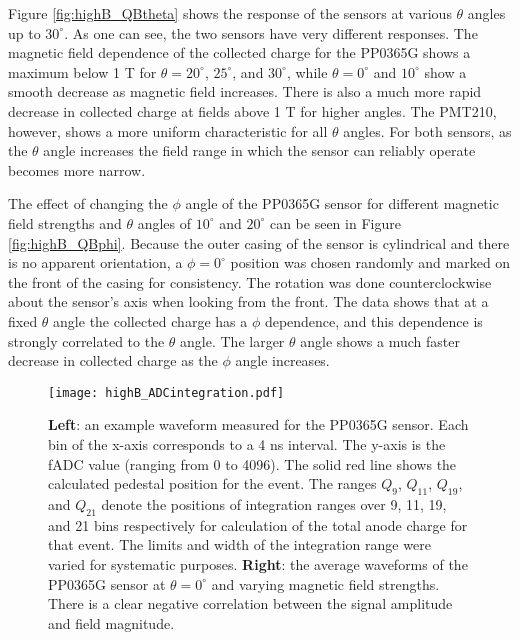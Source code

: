 Figure \ref{fig:highB_QBtheta} shows the response of the sensors at various $\theta$ angles up to $30^{\circ}$. As one can see, the two sensors have very different responses. The magnetic field dependence of the collected charge for the PP0365G shows a maximum below 1 T for $\theta = 20^{\circ}$, $25^{\circ}$, and $30^{\circ}$, while $\theta = 0^{\circ}$ and $10^{\circ}$ show a smooth decrease as magnetic field increases. There is also a much more rapid decrease in collected charge at fields above 1 T for higher angles. The PMT210, however, shows a more uniform characteristic for all $\theta$ angles. For both sensors, as the $\theta$ angle increases the field range in which the sensor can reliably operate becomes more narrow.

The effect of changing the $\phi$ angle of the PP0365G sensor for different magnetic field strengths and $\theta$ angles of $10^{\circ}$ and $20^{\circ}$ can be seen in Figure \ref{fig:highB_QBphi}. Because the outer casing of the sensor is cylindrical and there is no apparent orientation, a $\phi = 0^{\circ}$ position was chosen randomly and marked on the front of the casing for consistency. The rotation was done counterclockwise about the sensor's axis when looking from the front. The data shows that at a fixed $\theta$ angle the collected charge has a $\phi$ dependence, and this dependence is strongly correlated to the $\theta$ angle. The larger $\theta$ angle shows a much faster decrease in collected charge as the $\phi$ angle increases.

\begin{figure}[!htb]
	\centering
	\texttt{[image: highB\_ADCintegration.pdf]}
	\caption{\textbf{Left}: an example waveform measured for the PP0365G sensor. Each bin of the x-axis corresponds to a 4 ns interval. The y-axis is the fADC value (ranging from 0 to 4096). The solid red line shows the calculated pedestal position for the event. The ranges $Q_9$, $Q_{11}$, $Q_{19}$, and $Q_{21}$ denote the positions of integration ranges over 9, 11, 19, and 21 bins respectively for calculation of the total anode charge for that event. The limits and width of the integration range were varied for systematic purposes. \textbf{Right}: the average waveforms of the PP0365G sensor at $\theta = 0^{\circ}$ and varying magnetic field strengths. There is a clear negative correlation between the signal amplitude and field magnitude.}
	\label{fig:highB_waveform}
\end{figure}

